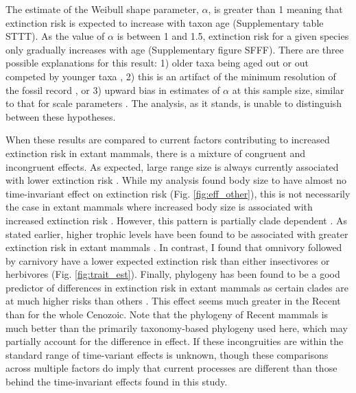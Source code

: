 \documentclass[12pt]{article}
\begin{document}
The estimate of the Weibull shape parameter, $\alpha$, is greater than 1 meaning that extinction risk is expected to increase with taxon age (Supplementary table STTT). As the value of $\alpha$ is between 1 and 1.5, extinction risk for a given species only gradually increases with age (Supplementary figure SFFF). There are three possible explanations for this result: 1) older taxa being aged out or out competed by younger taxa \cite{Wagner2014b}, 2) this is an artifact of the minimum resolution of the fossil record \cite{Sepkoski1975}, or 3) upward bias in estimates of $\alpha$ at this sample size, similar to that for scale parameters \cite{Gelman2013d}. The analysis, as it stands, is unable to distinguish between these hypotheses.


When these results are compared to current factors contributing to increased extinction risk in extant mammals, there is a mixture of congruent and incongruent effects. As expected, large range size is always currently associated with lower extinction risk \cite{Fritz2009,Fritz2010b,Liow2009,Purvis2000a}. While my analysis found body size to have almost no time-invariant effect on extinction risk (Fig. \ref{fig:eff_other}), this is not necessarily the case in extant mammals where increased body size is associated with increased extinction risk \cite{Liow2009,Purvis2000a}. However, this pattern is partially clade dependent \cite{Fritz2009}. As stated earlier, higher trophic levels have been found to be associated with greater extinction risk in extant mammals \cite{Purvis2000a,Liow2009}. In contrast, I found that omnivory followed by carnivory have a lower expected extinction risk than either insectivores or herbivores (Fig. \ref{fig:trait_est}). Finally, phylogeny has been found to be a good predictor of differences in extinction risk in extant mammals as certain clades are at much higher risks than others \cite{Fritz2010b}. This effect seems much greater in the Recent than for the whole Cenozoic. Note that the phylogeny of Recent mammals is much better than the primarily taxonomy-based phylogeny used here, which may partially account for the difference in effect. If these incongruities are within the standard range of time-variant effects is unknown, though these comparisons across multiple factors do imply that current processes are different than those behind the time-invariant effects found in this study. 
\end{document}
